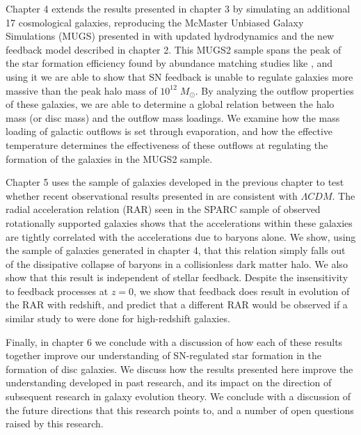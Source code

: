Chapter 4 extends the results presented in chapter 3 by simulating an additional
17 cosmological galaxies, reproducing the McMaster Unbiased Galaxy Simulations
(MUGS) presented in \citet{Stinson2010} with updated hydrodynamics and the new
feedback model described in chapter 2.  This MUGS2 sample spans the peak of the
star formation efficiency found by abundance matching studies like
\citet{Moster2013}, and using it we are able to show that SN feedback is unable
to regulate galaxies more massive than the peak halo mass of $10^{12}\;M_\odot$.
By analyzing the outflow properties of these galaxies, we are able to determine
a global relation between the halo mass (or disc mass) and the outflow mass
loadings.  We examine how the mass loading of galactic outflows is set through
evaporation, and how the effective temperature determines the effectiveness of
these outflows at regulating the formation of the galaxies in the MUGS2 sample.

Chapter 5 uses the sample of galaxies developed in the previous chapter to
test whether recent observational results presented in \citet{McGaugh2016}
are consistent with $\Lambda CDM$.  The radial acceleration relation (RAR) seen in
the SPARC sample \citep{Lelli2016b} of observed rotationally supported galaxies
shows that the accelerations within these galaxies are tightly correlated 
with the accelerations due to baryons alone.  We show, using the sample of
galaxies generated in chapter 4, that this relation simply falls out of the
dissipative collapse of baryons in a collisionless dark matter halo.  We also
show that this result is independent of stellar feedback.  Despite the insensitivity
to feedback processes at $z=0$, we show that feedback does result in evolution
of the RAR with redshift, and predict that a different RAR would be observed if
a similar study to \citet{Lelli2016b} were done for high-redshift galaxies.

Finally, in chapter 6 we conclude with a discussion of how each of these results
together improve our understanding of SN-regulated star formation in the
formation of disc galaxies.  We discuss how the results presented here improve
the understanding developed in past research, and its impact on the direction of
subsequent research in galaxy evolution theory.  We conclude with a discussion
of the future directions that this research points to, and a number of open
questions raised by this research.



